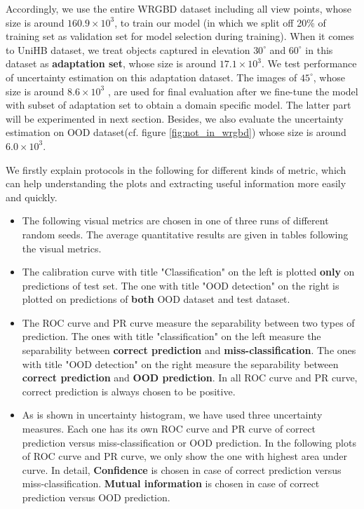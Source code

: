 Accordingly, we use the entire WRGBD dataset including all view points, whose size is around $160.9\times10^3$, to train our model (in which we split off 20\% of training set as validation set for model selection during training). When it comes to UniHB dataset, we treat objects captured in elevation $30^\circ$ and $60^\circ$ in this dataset as \textbf{adaptation set}, whose size is around $17.1\times10^3$. We test performance of uncertainty estimation on this adaptation dataset. The images of $45^\circ$, whose size is around $8.6\times10^3$ , are used for final evaluation after we fine-tune the model with subset of adaptation set to obtain a domain specific model. The latter part will be experimented in next section. Besides, we also evaluate the uncertainty estimation on OOD dataset(cf. figure \ref{fig:not_in_wrgbd}) whose size is around $6.0\times10^3$. 

We firstly explain protocols in the following for different kinds of metric, which can help understanding the plots and extracting useful information more easily and quickly.  
\begin{itemize}
	\item The following visual metrics are chosen in one of three runs of different random seeds. The average quantitative results are given in tables following the visual metrics.
	\item The calibration curve with title "Classification" on the left is plotted \textbf{only} on predictions of test set. The one with title "OOD detection" on the right is plotted on predictions of \textbf{both} OOD dataset and test dataset.
	\item The ROC curve and PR curve measure the separability between two types of prediction.
	The ones with title "classification" on the left measure the separability between \textbf{correct prediction} and \textbf{miss-classification}. The ones with title "OOD detection" on the right measure the separability between \textbf{correct prediction} and \textbf{OOD prediction}. In all ROC curve and PR curve, correct prediction is always chosen to be positive.
	\item As is shown in uncertainty histogram, we have used three uncertainty measures. Each one has its own ROC curve and PR curve of correct prediction versus miss-classification or OOD prediction. In the following plots of ROC curve and PR curve, we only show the one with highest area under curve. In detail, \textbf{Confidence} is chosen in case of correct prediction versus miss-classification. \textbf{Mutual information} is chosen in case of correct prediction versus OOD prediction.
\end{itemize}   


